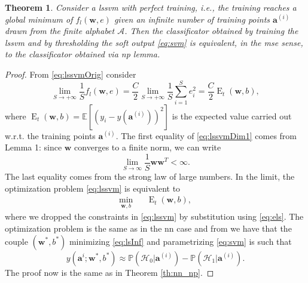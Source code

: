 \documentclass[draftcls,onecolumn,12pt]{IEEEtran}
\newcommand{\ie}{i.e., }
\newcommand{\wrt}{w.r.t. }
\newcommand{\Exp}[1]{\mathbb{E}\left[#1\right]}
\DeclareMathOperator{\E}{E}
\newtheorem{theorem}{Theorem}
\begin{document}
\begin{theorem}
	\label{th:lsnp}
	Consider a \ac{lssvm} with perfect training, \ie the training reaches a global minimum of $f_l(\mathbf{w},e)$ given an infinite number of training points $\bm{a}^{(i)}$ drawn from the finite alphabet $\mathcal A$. Then the classificator obtained by training the \ac{lssvm} and by thresholding the soft output \eqref{eq:svm} is equivalent, in the \ac{mse} sense, to the classificator obtained via \ac{np} lemma.
\end{theorem}
\begin{proof}
	From \eqref{eq:lssvmOrig} consider
	\begin{equation}
	\label{eq:lssvmDim1}
	\lim_{S \to +\infty} \frac{1}{S} f_l(\mathbf{w},e) =\frac{C}{2} \lim_{S \to +\infty}\frac{1}{S}  \sum_{i=1}^S e^2_i	=\frac{C}{2}\E_t(\mathbf{w},b),
	\end{equation}
	where $\E_t(\mathbf{w},b) = \Exp{\left(y_i - y(\mathbf{a}^{(i)})\right)^2} $ is the expected value carried out \wrt the training points $\mathbf{a}^{(i)}$. 
	The first equality of \eqref{eq:lssvmDim1} comes from Lemma 1: since $\mathbf{w}$ converges to a finite norm, we can write
	\begin{equation}
	\lim_{S\to \infty} \frac{1}{S} \mathbf{w} \mathbf{w}^T 	< \infty.
	\end{equation} 
	The last equality comes from the strong law of large numbers. In the limit, the optimization problem \eqref{eq:lssvm} is equivalent to
	\begin{equation}
	\label{eq:lsInf}
	\begin{aligned}
	& \underset{\mathbf{w},b}{\text{min}} & &  \E_t(\mathbf{w},b), & 
	\end{aligned}	
	\end{equation}
	where we dropped the constraints in \eqref{eq:lssvm} by substitution using \eqref{eq:els}. The optimization problem is the same as in the \ac{nn} case and from \cite{Ruck-90} we have that the couple $(\mathbf{w}^*,b^*)$ minimizing \eqref{eq:lsInf} and parametrizing \eqref{eq:svm} is such that
	\begin{equation}
	y(\mathbf{a}^i;\mathbf{w}^*,b^*)  \approx \mathbb{P}(\mathcal{H}_0|\mathbf{a}^{(i)}) - \mathbb{P}(\mathcal{H}_1|\mathbf{a}^{(i)}).
	\end{equation}
	The proof now is the same as in Theorem \ref{th:nn_np}.
\end{proof}
\end{document}
